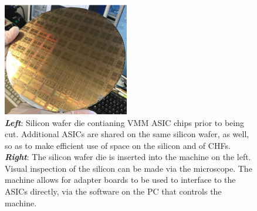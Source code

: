 \begin{figure}[!htb]
    \begin{center}
        \includegraphics[width=0.49\textwidth]{figures/nsw/use_cases/verso_use_case_vmm_die}
        \caption{
            \textbf{\textit{Left}}: Silicon wafer die contianing VMM ASIC chips prior to being cut.
                Additional ASICs are shared on the same silicon wafer, as well, so as to make efficient
                use of space on the silicon and of CHFs.
            \textbf{\textit{Right}}: The silicon wafer die is inserted into the machine on the left.
                Visual inspection of the silicon can be made via the microscope.
                The machine allows for adapter boards to be used to interface to the ASICs directly,
                via the software on the PC that controls the machine.
        }
        \label{fig:vrs_vmm_prod}
    \end{center}
\end{figure}
